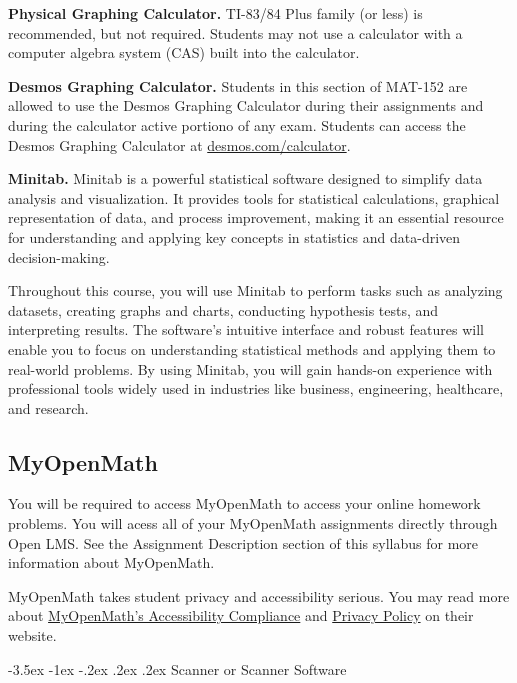 \documentclass{article}
\makeatletter
\renewcommand\section{\@startsection{section}{1}{0pt}%
  {-3.5ex \@plus -1ex \@minus -.2ex}%
  {.2ex \@plus.2ex}%
  {\normalfont\Large\bfseries}} %
\makeatother
\begin{document}
\textbf{Physical Graphing Calculator.} TI-83/84 Plus family (or less) is recommended, but not required. Students may not use a calculator with a computer algebra system (CAS) built into the calculator.

\textbf{Desmos Graphing Calculator.} Students in this section of MAT-152 are allowed to use the Desmos Graphing Calculator during their assignments and during the calculator active portiono of any exam. Students can access the Desmos Graphing Calculator at \href{https://www.desmos.com/calculator}{desmos.com/calculator}.

\textbf{Minitab.} Minitab is a powerful statistical software designed to simplify data analysis and visualization. It provides tools for statistical calculations, graphical representation of data, and process improvement, making it an essential resource for understanding and applying key concepts in statistics and data-driven decision-making.

Throughout this course, you will use Minitab to perform tasks such as analyzing datasets, creating graphs and charts, conducting hypothesis tests, and interpreting results. The software's intuitive interface and robust features will enable you to focus on understanding statistical methods and applying them to real-world problems. By using Minitab, you will gain hands-on experience with professional tools widely used in industries like business, engineering, healthcare, and research.

\subsection{MyOpenMath}

You will be required to access MyOpenMath to access your online homework problems. You will acess all of your MyOpenMath assignments directly through Open LMS. See the Assignment Description section of this syllabus for more information about MyOpenMath.

MyOpenMath takes student privacy and accessibility serious. You may read more about \href{https://asccc.org/sites/default/files/MyOpenMath\%20\_\%20WAMAP\%20\_\%20IMathAS\%20Accessibility.pdf}{MyOpenMath's Accessibility Compliance} and \href{https://www.myopenmath.com/info/policies/privacy.php}{Privacy Policy} on their website.

\section{Scanner or Scanner Software}
\end{document}
